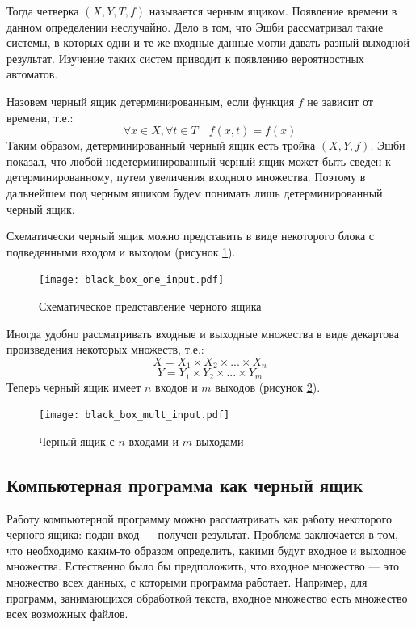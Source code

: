 \documentclass[a4paper,14pt,href]{article}
\begin{document}
Тогда четверка $(X,Y,T,f)$ называется черным ящиком. Появление времени в данном определении неслучайно. Дело в том, что Эшби рассматривал такие системы, в которых одни и те же входные данные могли давать разный выходной результат. Изучение таких систем приводит к появлению вероятностных автоматов.

Назовем черный ящик детерминированным, если функция $f$ не зависит от времени, т.е.:
	$$ \forall x \in X, \forall t \in T \quad f(x,t)=f(x) $$
Таким образом, детерминированный черный ящик есть тройка $(X,Y,f)$. Эшби показал, что любой недетерминированный черный ящик может быть сведен к детерминированному, путем увеличения входного множества. Поэтому в дальнейшем под черным ящиком будем понимать лишь детерминированный черный ящик.

	Схематически черный ящик можно представить в виде некоторого блока с подведенными входом и выходом (рисунок \ref{fig:BlackBoxOne}).

\begin{figure}[htbp]
\begin{center}
	\texttt{[image: black\_box\_one\_input.pdf]}
    \caption{Схематическое представление черного ящика}
    \label{fig:BlackBoxOne}
\end{center}
\end{figure}

	Иногда удобно рассматривать входные и выходные множества в виде декартова произведения некоторых множеств, т.е.:
	$$ X = X_{1} \times X_{2} \times ... \times X_{n} $$
	$$ Y = Y_{1} \times Y_{2} \times ... \times Y_{m} $$
Теперь черный ящик имеет $n$ входов и $m$ выходов (рисунок \ref{fig:BlackBoxMult}).

\begin{figure}[htbp]
\begin{center}
	\texttt{[image: black\_box\_mult\_input.pdf]}
    \caption{Черный ящик с $n$ входами и $m$ выходами}
    \label{fig:BlackBoxMult}
\end{center}
\end{figure}

\subsection{Компьютерная программа как черный ящик}
	Работу компьютерной программу можно рассматривать как работу некоторого черного ящика: подан вход --- получен результат. Проблема заключается в том, что необходимо каким-то образом определить, какими будут входное и выходное множества. Естественно было бы предположить, что входное множество --- это множество всех данных, с которыми программа работает. Например, для программ, занимающихся обработкой текста, входное множество есть множество всех возможных файлов.
\end{document}
